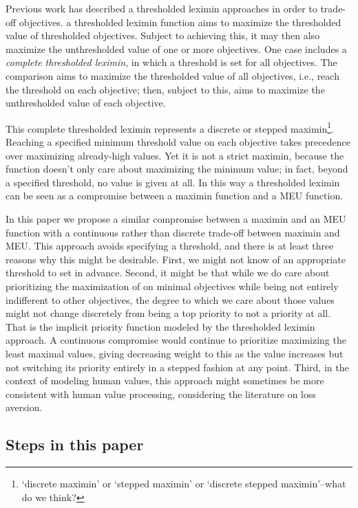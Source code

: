 Previous work \cite{vamplew_potential-based_2021} has described a thresholded leximin approaches in order to trade-off objectives. a thresholded leximin function aims to maximize the thresholded value of thresholded objectives. Subject to achieving this, it may then also maximize the unthresholded value of one or more objectives. One case includes a \textit{complete thresholded leximin}, in which a threshold is set for all objectives. The comparison aims to maximize the thresholded value of all objectives, i.e., reach the threshold on each objective; then, subject to this, aims to maximize the unthresholded value of each objective.

This complete thresholded leximin represents a discrete or stepped maximin\footnote{`discrete maximin' or `stepped maximin' or `discrete stepped maximin'--what do we think?}. Reaching a specified minimum threshold value on each objective takes precedence over maximizing already-high values. Yet it is not a strict maximin, because the function doesn't only care about maximizing the minimum value; in fact, beyond a specified threshold, no value is given at all. In this way a thresholded leximin can be seen as a compromise between a maximin function and a MEU function.

In this paper we propose a similar compromise between a maximin and an MEU function with a continuous rather than discrete trade-off between maximin and MEU. This approach avoids specifying a threshold, and there is at least three reasons why this might be desirable. First, we might not know of an appropriate threshold to set in advance. Second, it might be that while we do care about prioritizing the maximization of on minimal objectives while being not entirely indifferent to other objectives, the degree to which we care about those values might not change discretely from being a top priority to not a priority at all. That is the implicit priority function modeled by the thresholded leximin approach. A continuous compromise would continue to prioritize maximizing the least maximal values, giving decreasing weight to this as the value increases but not switching its priority entirely in a stepped fashion at any point. Third, in the context of modeling human values, this approach might sometimes be more consistent with human value processing, considering the literature on loss aversion.

\subsection{Steps in this paper}


